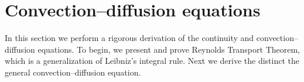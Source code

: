 
\section{Convection--diffusion equations} \label{sec:the_convection_diffusion_equations}

In this section we perform a rigorous derivation of the continuity and convection--diffusion equations. To begin, we present and prove Reynolds Transport Theorem, which is a generalization of Leibniz's integral rule. Next we derive the distinct the general convection--diffusion equation. 



%
%
%



